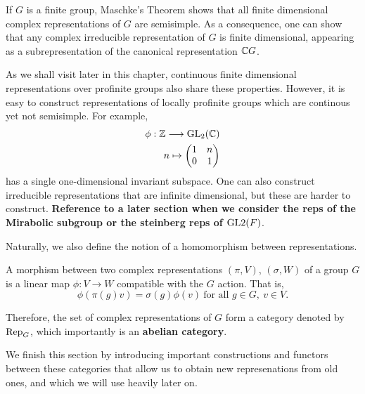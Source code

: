 \begin{rem}\label{rem_semisimple}
    If $G$ is a finite group, Maschke's Theorem shows that all finite dimensional complex representations of $G$ are semisimple. As a consequence, one can show that any complex irreducible representation of $G$ is finite dimensional, appearing as a subrepresentation of the canonical representation $\mathbb{C} G$. 
    
    As we shall visit later in this chapter, continuous finite dimensional representations over profinite groups also share these properties. However, it is easy to construct representations of locally profinite groups which are continous yet not semisimple. For example,
    \begin{align*}
        \phi:\mathbb{Z}\longrightarrow \mathrm{GL}_2(\mathbb{C})\\
        n\mapsto 
        \begin{pmatrix}
            1 & n\\
            0 & 1\\
        \end{pmatrix}
    \end{align*}
    has a single one-dimensional invariant subspace. One can also construct irreducible representations that are infinite dimensional, but these are harder to construct. \textbf{Reference to a later section when we consider the reps of the Mirabolic subgroup or the steinberg reps of $\mathrm{GL}2(F)$}.
\end{rem}


Naturally, we also define the notion of a homomorphism between representations.

\begin{defn}
    A morphism between two complex representations $(\pi,V)$, $(\sigma,W)$ of a group $G$ is a linear map $\phi:V\rightarrow W$ compatible with the $G$ action. That is, 
    $$\phi(\pi(g)v)=\sigma(g)\phi(v)\ \text{for all } g\in G,\ v\in V.$$
\end{defn}

Therefore, the set of complex representations of $G$ form a category denoted by $\mathrm{Rep}_G$, which importantly is an \textbf{abelian category}.

We finish this section by introducing important constructions and functors between these categories that allow us to obtain new represenations from old ones, and which we will use heavily later on.

